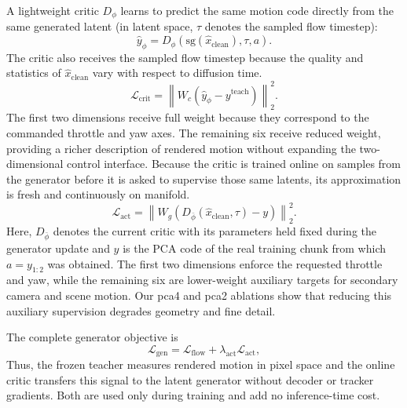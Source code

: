 \documentclass[letterpaper]{article} %
\begin{document}
A lightweight critic $D_\phi$ learns to predict the same motion code directly
from the same generated latent (in latent space, $\tau$ denotes the sampled flow timestep):
\begin{equation}
    \hat y_\phi
    =
    D_\phi
    \left(
        \mathrm{sg}(\hat{x}_{\mathrm{clean}}),\tau,a
    \right).
    \label{eq:critic_prediction}
\end{equation}
The critic also receives the sampled flow timestep because the quality and
statistics of $\hat{x}_{\mathrm{clean}}$ vary with respect to diffusion time.
\begin{equation}
    \mathcal{L}_{\mathrm{crit}}
    =
    \left\|
        W_c
        \left(
            \hat y_\phi-y^{\mathrm{teach}}
        \right)
    \right\|_2^2.
    \label{eq:critic_loss}
\end{equation}
The first two dimensions receive full weight because they correspond to the
commanded throttle and yaw axes. The remaining six receive reduced weight,
providing a richer description of rendered motion without expanding the
two-dimensional control interface. Because the critic
is trained online on samples from the generator before it is asked to supervise those same latents, its approximation is fresh and continuously on manifold.
\begin{equation}
    \mathcal{L}_{\mathrm{act}}
    =
    \left\|
        W_g
        \left(
            D_{\bar\phi}(\hat{x}_{\mathrm{clean}},\tau)
            -
            y
        \right)
    \right\|_2^2.
    \label{eq:latent_action_loss}
\end{equation}
Here, $D_{\bar\phi}$ denotes the current critic with its parameters held fixed
during the generator update and $y$ is the PCA code of the real training chunk from which
$a=y_{1:2}$ was obtained. The first two dimensions enforce the requested
throttle and yaw, while the remaining six are lower-weight auxiliary targets
for secondary camera and scene motion. Our pca4 and pca2 ablations show
that reducing this auxiliary supervision degrades geometry and fine detail.

The complete generator objective is
\begin{equation}
    \mathcal{L}_{\mathrm{gen}}
    =
    \mathcal{L}_{\mathrm{flow}}
    +
    \lambda_{\mathrm{act}}
    \mathcal{L}_{\mathrm{act}},
    \label{eq:generator_objective}
\end{equation}
Thus, the frozen teacher measures rendered motion in pixel space and the online
critic transfers this signal to the latent generator without decoder or tracker
gradients. Both are used only during training and add no inference-time cost.
\end{document}
